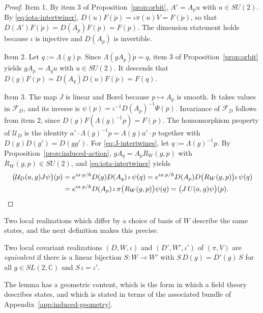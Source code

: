 \begin{proof}
	Item 1. By item 3 of Proposition~\ref{prop:orbit}, $A'=A_pu$ with $u\in SU(2)$. By \eqref{eq:iota-intertwiner}, $D(u)F(\mathring{p})=\iota\pi(u)V=F(\mathring{p})$, so that $D(A')F(\mathring{p})=D(A_p)F(\mathring{p})=F(p)$. The dimension statement holds because $\iota$ is injective and $D(A_p)$ is invertible.
	
	Item 2. Let $q:=\Lambda(g)p$. Since $\Lambda(gA_p)\mathring{p}=q$, item 3 of Proposition~\ref{prop:orbit} yields $gA_p=A_qu$ with $u\in SU(2)$. It descends that $D(g)F(p)=D(A_q)D(u)F(\mathring{p})=F(q)$.
	
	Item 3. The map $J$ is linear and Borel because $p\mapsto A_p$ is smooth. It takes values in $\mathcal{F}_D$, and its inverse is $\psi(p)=\iota^{-1}D(A_p)^{-1}\Psi(p)$. Invariance of $\mathcal{F}_D$ follows from item 2, since $D(g)F(\Lambda(g)^{-1}p)=F(p)$. The homomorphism property of $\mathcal{U}_D$ is the identity $a'\cdot\Lambda(g)^{-1}p=\Lambda(g)a'\cdot p$ together with $D(g)D(g')=D(gg')$. For \eqref{eq:J-intertwines}, let $q:=\Lambda(g)^{-1}p$. By Proposition~\ref{prop:induced-action}, $gA_q=A_pR_W(g,p)$ with $R_W(g,p)\in SU(2)$, and \eqref{eq:iota-intertwiner} yields
	\begin{align*}
		\big(\mathcal{U}_D(a,g)J\psi\big)(p)&=e^{ia\cdot p/\hbar}D(g)D(A_q)\,\iota\,\psi(q)=e^{ia\cdot p/\hbar}D(A_p)D\big(R_W(g,p)\big)\iota\,\psi(q)\\
		&=e^{ia\cdot p/\hbar}D(A_p)\,\iota\,\pi\big(R_W(g,p)\big)\psi(q)=\big(J\,U(a,g)\psi\big)(p).\qedhere
	\end{align*}
\end{proof}

\noindent Two local realizations which differ by a choice of basis of $W$ describe the same states, and the next definition makes this precise.

\begin{definition}\label{def:equivalent-local-realizations}
	Two local covariant realizations $(D,W,\iota)$ and $(D',W',\iota')$ of $(\pi,V)$ are \emph{equivalent} if there is a linear bijection $S:W\to W'$ with $S\,D(g)=D'(g)\,S$ for all $g\in SL(2,\mathbb{C})$ and $S\,\iota=\iota'$.
\end{definition}

The lemma has a geometric content, which is the form in which a field theory describes states, and which is stated in terms of the associated bundle of Appendix~\ref{app:induced-geometry}.

